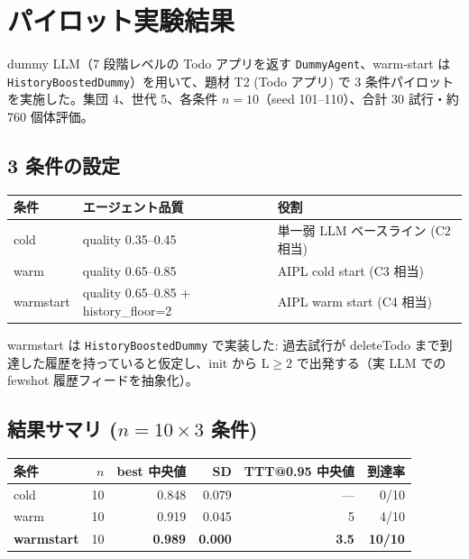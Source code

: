 \documentclass[a4paper,11pt]{ltjsarticle}
\begin{document}
\section{パイロット実験結果}

dummy LLM（7 段階レベルの Todo アプリを返す \texttt{DummyAgent}、warm-start は \texttt{HistoryBoostedDummy}）を用いて、題材 T2 (Todo アプリ) で 3 条件パイロットを実施した。集団 4、世代 5、各条件 \textbf{$n=10$}（seed 101--110）、合計 30 試行・約 760 個体評価。

\subsection{3 条件の設定}

\begin{center}
\begin{tabular}{@{}lll@{}}
\toprule
条件 & エージェント品質 & 役割 \\
\midrule
cold      & quality 0.35--0.45 & 単一弱 LLM ベースライン (C2 相当) \\
warm      & quality 0.65--0.85 & AIPL cold start (C3 相当)         \\
warmstart & quality 0.65--0.85 + history\_floor=2 & AIPL warm start (C4 相当) \\
\bottomrule
\end{tabular}
\end{center}

warmstart は \texttt{HistoryBoostedDummy} で実装した: 過去試行が deleteTodo まで到達した履歴を持っていると仮定し、init から L$\geq 2$ で出発する（実 LLM での fewshot 履歴フィードを抽象化）。

\subsection{結果サマリ ($n=10 \times 3$ 条件)}

\begin{center}
\begin{tabular}{@{}lrrrrr@{}}
\toprule
条件 & $n$ & best 中央値 & SD & TTT@0.95 中央値 & 到達率 \\
\midrule
cold      & 10 & 0.848 & 0.079 & ---   & 0/10 \\
warm      & 10 & 0.919 & 0.045 & 5     & 4/10 \\
\textbf{warmstart} & 10 & \textbf{0.989} & \textbf{0.000} & \textbf{3.5} & \textbf{10/10} \\
\bottomrule
\end{tabular}
\end{center}
\end{document}

